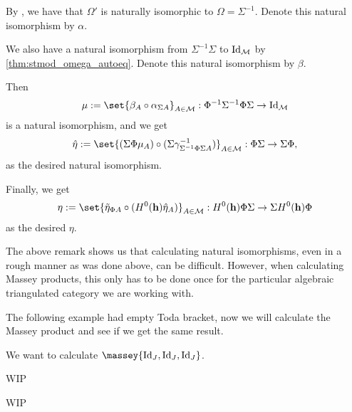 \begin{remark}
    By \cite[p.\ 13]{Happel_1988}, we have that \( \Omega' \) is naturally isomorphic to \( \Omega = \Sigma^{-1} \). Denote this natural isomorphism by \( \alpha \).

    We also have a natural isomorphism from \( \Sigma^{-1} \Sigma \) to \( \operatorname{Id}_{{\mathcal{M}}} \) by \autoref{thm:stmod_omega_autoeq}. Denote this natural isomorphism by \( \beta \).

    Then
    \[
       \mu := \set{ \beta_A \circ \alpha_{\Sigma A} }_{A \in \Mc} :\Phi^{-1} \Sigma^{-1} \Phi \Sigma \to \Id_{\Mc}
    \]
    is a natural isomorphism, and we get
    \[
        \hat{\eta} := \set{(\Sigma \Phi \mu_A) \circ (\Sigma \gamma^{-1}_{\Sigma^{-1} \Phi \Sigma A})}_{A \in \Mc}: \Phi \Sigma \to \Sigma \Phi,
    \]
    as the desired natural isomorphism.

    Finally, we get
    \[
        \eta := \set{ \tilde{\eta}_{\Phi A} \circ (H^0(\mathbf{h}) \hat{\eta}_A) }_{A \in \Mc}: H^0(\mathbf{h}) \Phi \Sigma \to \Sigma H^0(\mathbf{h}) \Phi
    \]
    as the desired \( \eta \).
\end{remark}

The above remark shows us that calculating natural isomorphisms, even in a rough manner as was done above, can be difficult. However, when calculating Massey products, this only has to be done once for the particular algebraic triangulated category we are working with.

The following example had empty Toda bracket, now we will calculate the Massey product and see if we get the same result.

\begin{example}
	We want to calculate \( \massey{\Id_J, \Id_J, \Id_J} \).

    WIP
\end{example}

WIP